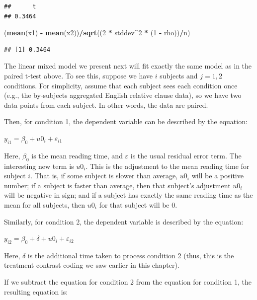 \documentclass[12pt,]{krantz}
\newenvironment{Shaded}{\begin{snugshade}}{\end{snugshade}}
\newcommand{\DecValTok}[1]{\textcolor[rgb]{0.00,0.00,0.81}{#1}}
\newcommand{\KeywordTok}[1]{\textcolor[rgb]{0.13,0.29,0.53}{\textbf{#1}}}
\newcommand{\NormalTok}[1]{#1}
\newcommand{\OperatorTok}[1]{\textcolor[rgb]{0.81,0.36,0.00}{\textbf{#1}}}
\newcommand{\StringTok}[1]{\textcolor[rgb]{0.31,0.60,0.02}{#1}}
\begin{document}
\begin{verbatim}
##      t 
## 0.3464
\end{verbatim}

\begin{Shaded}
\begin{Highlighting}[]
\NormalTok{(}\KeywordTok{mean}\NormalTok{(x1) }\OperatorTok{-}\StringTok{ }\KeywordTok{mean}\NormalTok{(x2))}\OperatorTok{/}\KeywordTok{sqrt}\NormalTok{((}\DecValTok{2} \OperatorTok{*}\StringTok{ }\NormalTok{stddev}\OperatorTok{^}\DecValTok{2} \OperatorTok{*}\StringTok{ }
\StringTok{  }\NormalTok{(}\DecValTok{1} \OperatorTok{-}\StringTok{ }\NormalTok{rho))}\OperatorTok{/}\NormalTok{n)}
\end{Highlighting}
\end{Shaded}

\begin{verbatim}
## [1] 0.3464
\end{verbatim}

The linear mixed model we present next will fit exactly the same model as in the paired t-test above. To see this, suppose we have \(i\) subjects and \(j=1,2\) conditions. For simplicity, assume that each subject sees each condition once (e.g., the by-subjects aggregated English relative clause data), so we have two data points from each subject. In other words, the data are paired.

Then, for condition 1, the dependent variable can be described by the equation:

\(y_{i1} = \beta_0 + u0_i + \varepsilon_{i1}\)

Here, \(\beta_0\) is the mean reading time, and \(\varepsilon\) is the usual residual error term. The interesting new term is \(u0_i\). This is the adjustment to the mean reading time for subject \(i\). That is, if some subject is slower than average, \(u0_i\) will be a positive number; if a subject is faster than average, then that subject's adjustment \(u0_i\) will be negative in sign; and if a subject has exactly the same reading time as the mean for all subjects, then \(u0_i\) for that subject will be 0.

Similarly, for condition 2, the dependent variable is described by the equation:

\(y_{i2} = \beta_0 + \delta + u0_i + \varepsilon_{i2}\)

Here, \(\delta\) is the additional time taken to process condition 2 (thus, this is the treatment contrast coding we saw earlier in this chapter).

If we subtract the equation for condition 2 from the equation for condition 1, the resulting equation is:
\end{document}
